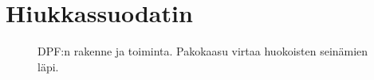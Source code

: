\chapter{Hiukkassuodatin}%
\label{ch:dpf}

\begin{figure}[H]
    \centering 
    
    \caption{DPF:n rakenne ja toiminta. Pakokaasu virtaa huokoisten seinämien läpi. }
    \label{fig:wall-flow-dpf}
\end{figure}


\begin{figure}[H]
    \centering 
    
    \caption{}
    \label{fig:}
\end{figure}